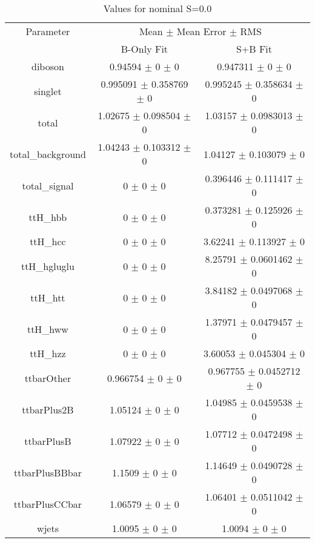 \begin{table}
\centering
\caption{Values for nominal S=0.0}
\begin{tabular}{ccc}
\toprule
Parameter & \multicolumn{2}{c}{Mean $\pm$ Mean Error $\pm$ RMS}\\
 & B-Only Fit & S+B Fit\\
\midrule
diboson & \num{0.94594} $\pm$ \num{0} $\pm$ \num{0} & \num{0.947311} $\pm$ \num{0} $\pm$ \num{0}\\
singlet & \num{0.995091} $\pm$ \num{0.358769} $\pm$ \num{0} & \num{0.995245} $\pm$ \num{0.358634} $\pm$ \num{0}\\
total & \num{1.02675} $\pm$ \num{0.098504} $\pm$ \num{0} & \num{1.03157} $\pm$ \num{0.0983013} $\pm$ \num{0}\\
total\_background & \num{1.04243} $\pm$ \num{0.103312} $\pm$ \num{0} & \num{1.04127} $\pm$ \num{0.103079} $\pm$ \num{0}\\
total\_signal & \num{0} $\pm$ \num{0} $\pm$ \num{0} & \num{0.396446} $\pm$ \num{0.111417} $\pm$ \num{0}\\
ttH\_hbb & \num{0} $\pm$ \num{0} $\pm$ \num{0} & \num{0.373281} $\pm$ \num{0.125926} $\pm$ \num{0}\\
ttH\_hcc & \num{0} $\pm$ \num{0} $\pm$ \num{0} & \num{3.62241} $\pm$ \num{0.113927} $\pm$ \num{0}\\
ttH\_hgluglu & \num{0} $\pm$ \num{0} $\pm$ \num{0} & \num{8.25791} $\pm$ \num{0.0601462} $\pm$ \num{0}\\
ttH\_htt & \num{0} $\pm$ \num{0} $\pm$ \num{0} & \num{3.84182} $\pm$ \num{0.0497068} $\pm$ \num{0}\\
ttH\_hww & \num{0} $\pm$ \num{0} $\pm$ \num{0} & \num{1.37971} $\pm$ \num{0.0479457} $\pm$ \num{0}\\
ttH\_hzz & \num{0} $\pm$ \num{0} $\pm$ \num{0} & \num{3.60053} $\pm$ \num{0.045304} $\pm$ \num{0}\\
ttbarOther & \num{0.966754} $\pm$ \num{0} $\pm$ \num{0} & \num{0.967755} $\pm$ \num{0.0452712} $\pm$ \num{0}\\
ttbarPlus2B & \num{1.05124} $\pm$ \num{0} $\pm$ \num{0} & \num{1.04985} $\pm$ \num{0.0459538} $\pm$ \num{0}\\
ttbarPlusB & \num{1.07922} $\pm$ \num{0} $\pm$ \num{0} & \num{1.07712} $\pm$ \num{0.0472498} $\pm$ \num{0}\\
ttbarPlusBBbar & \num{1.1509} $\pm$ \num{0} $\pm$ \num{0} & \num{1.14649} $\pm$ \num{0.0490728} $\pm$ \num{0}\\
ttbarPlusCCbar & \num{1.06579} $\pm$ \num{0} $\pm$ \num{0} & \num{1.06401} $\pm$ \num{0.0511042} $\pm$ \num{0}\\
wjets & \num{1.0095} $\pm$ \num{0} $\pm$ \num{0} & \num{1.0094} $\pm$ \num{0} $\pm$ \num{0}\\
\bottomrule
\end{tabular}
\end{table}